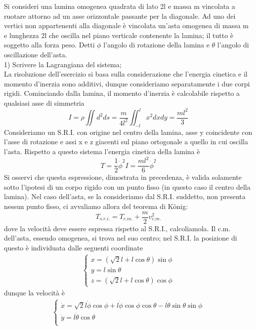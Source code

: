 \documentclass[
10pt, %
a4paper, %
oneside, %
headinclude,footinclude, %
BCOR5mm, %
]{scrartcl}
\begin{document}
\begin{esercizio}
	Si consideri una lamina omogenea quadrata di lato 2l e massa m vincolata a ruotare attorno
	ad un asse orizzontale passante per la diagonale. Ad uno dei vertici non appartenenti
	alla diagonale è vincolata un'asta omogenea di massa m e lunghezza 2l che oscilla nel
	piano verticale contenente la lamina; il tutto è soggetto alla forza peso. Detti $\phi$ l'angolo di rotazione della lamina e $\theta$ l'angolo di oscillazione dell'asta.\\
	1) Scrivere la Lagrangiana del sistema;\\

	La risoluzione dell'esercizio si basa sulla considerazione che l'energia cinetica e il momento d'inerzia sono additivi, dunque consideriamo separatamente i due corpi rigidi. Cominciando dalla lamina, il momento d'inerzia è calcolabile rispetto a qualsiasi asse di simmetria
	\[I = \rho\iint d^2 ds = \frac{m}{4l^2}\iint_{-l}^{l} x^2 dxdy = \frac{ml^2}{3}\]
	Consideriamo un S.R.I. con origine nel centro della lamina, asse y coincidente con l'asse di rotazione e assi x e z giacenti sul piano ortogonale a quello in cui oscilla l'asta. Rispetto a questo sistema l'energia cinetica della lamina è
	\[ T = \frac{1}{2}\dot{\phi}^2I = \frac{ml^2}{6}\dot{\phi}^2\]
	Si osservi che questa espressione, dimostrata in precedenza, è valida solamente sotto l'ipotesi di un corpo rigido con un punto fisso (in questo caso il centro della lamina). Nel caso dell'asta, se la consideriamo dal S.R.I. suddetto, non presenta nessun punto fisso, ci avvaliamo allora del teorema di K\"{o}nig: 
	\[T_{s.r.i.} = T_{c.m.} + \frac{m}{2}v_{c.m.}^2\]
	dove la velocità deve essere espressa rispetto al S.R.I., calcoliamola. Il c.m. dell'asta, essendo omogenea, si trova nel suo centro; nel S.R.I. la posizione di questo è individuata dalle seguenti coordinate
	\begin{align*}
		\begin{cases}
			x = (\sqrt{2}l + l\cos\theta)\sin\phi\\
			y = l\sin\theta\\
			z = (\sqrt{2}l + l\cos\theta)\cos\phi
		\end{cases}
	\end{align*}
	dunque la velocità è
	\begin{align*}
		\begin{cases}
			\dot{x} = \sqrt{2}l\dot{\phi}\cos\phi+l\dot{\phi}\cos\phi\cos\theta-l\dot{\theta}\sin\theta\sin\phi\\
			\dot{y} = l\dot{\theta}\cos\theta\\

\end{cases}
\end{align*}
\end{esercizio}
\end{document}
